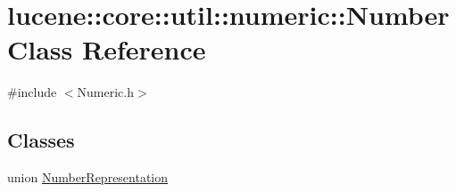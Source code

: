 \hypertarget{classlucene_1_1core_1_1util_1_1numeric_1_1Number}{}\section{lucene\+:\+:core\+:\+:util\+:\+:numeric\+:\+:Number Class Reference}
\label{classlucene_1_1core_1_1util_1_1numeric_1_1Number}


{\ttfamily \#include $<$Numeric.\+h$>$}

\subsection*{Classes}
\begin{DoxyCompactItemize}
\item 
union \mbox{\hyperlink{unionlucene_1_1core_1_1util_1_1numeric_1_1Number_1_1NumberRepresentation}{Number\+Representation}}
\end{DoxyCompactItemize}
